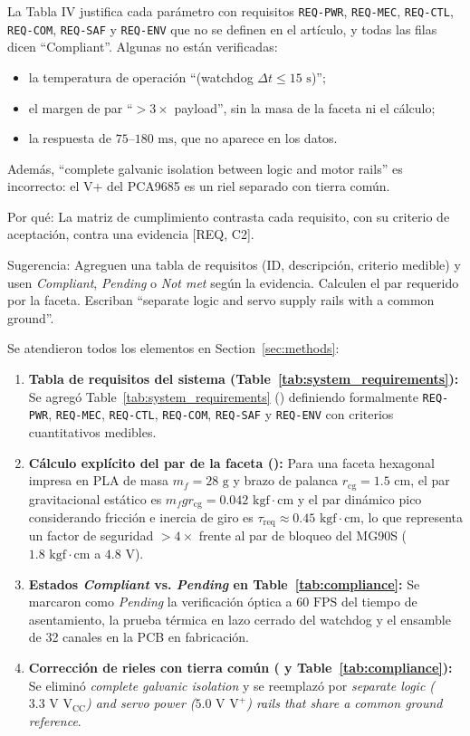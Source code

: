 \documentclass{LabDSTresponse}
\begin{document}
{La Tabla IV justifica cada parámetro con requisitos \texttt{REQ-PWR}, \texttt{REQ-MEC}, \texttt{REQ-CTL}, \texttt{REQ-COM}, \texttt{REQ-SAF} y \texttt{REQ-ENV} que no se definen en el artículo, y todas las filas dicen “Compliant”. Algunas no están verificadas:
\begin{itemize}
    \item la temperatura de operación “(watchdog $\Delta t \le 15\text{ s}$)”;
    \item el margen de par “$> 3\times$ payload”, sin la masa de la faceta ni el cálculo;
    \item la respuesta de $75\text{--}180\text{ ms}$, que no aparece en los datos.
\end{itemize}
Además, “complete galvanic isolation between logic and motor rails” es incorrecto: el V+ del PCA9685 es un riel separado con tierra común.

Por qué: La matriz de cumplimiento contrasta cada requisito, con su criterio de aceptación, contra una evidencia [REQ, C2].

Sugerencia: Agreguen una tabla de requisitos (ID, descripción, criterio medible) y usen \textit{Compliant}, \textit{Pending} o \textit{Not met} según la evidencia. Calculen el par requerido por la faceta. Escriban “separate logic and servo supply rails with a common ground”.}
{Se atendieron todos los elementos en Section~\ref{sec:methods}:
\begin{enumerate}
    \item \textbf{Tabla de requisitos del sistema (Table~\ref{tab:system_requirements}):} Se agregó Table~\ref{tab:system_requirements} () definiendo formalmente \texttt{REQ-PWR}, \texttt{REQ-MEC}, \texttt{REQ-CTL}, \texttt{REQ-COM}, \texttt{REQ-SAF} y \texttt{REQ-ENV} con criterios cuantitativos medibles.
    \item \textbf{Cálculo explícito del par de la faceta ():} Para una faceta hexagonal impresa en PLA de masa $m_f = 28\text{ g}$ y brazo de palanca $r_{\text{cg}} = 1.5\text{ cm}$, el par gravitacional estático es $m_f g r_{\text{cg}} = 0.042\text{ kgf}\cdot\text{cm}$ y el par dinámico pico considerando fricción e inercia de giro es $\tau_{\text{req}} \approx 0.45\text{ kgf}\cdot\text{cm}$, lo que representa un factor de seguridad $> 4\times$ frente al par de bloqueo del MG90S ($1.8\text{ kgf}\cdot\text{cm}$ a $4.8\text{ V}$).
    \item \textbf{Estados \textit{Compliant} vs. \textit{Pending} en Table~\ref{tab:compliance}:} Se marcaron como \textit{Pending} la verificación óptica a $60\text{ FPS}$ del tiempo de asentamiento, la prueba térmica en lazo cerrado del watchdog y el ensamble de 32 canales en la PCB en fabricación.
    \item \textbf{Corrección de rieles con tierra común ( y Table~\ref{tab:compliance}):} Se eliminó \textit{complete galvanic isolation} y se reemplazó por \textit{separate logic ($3.3\text{ V }\text{V}_{\text{CC}}$) and servo power ($5.0\text{ V }\text{V}^+$) rails that share a common ground reference}.
\end{enumerate}}
\end{document}
